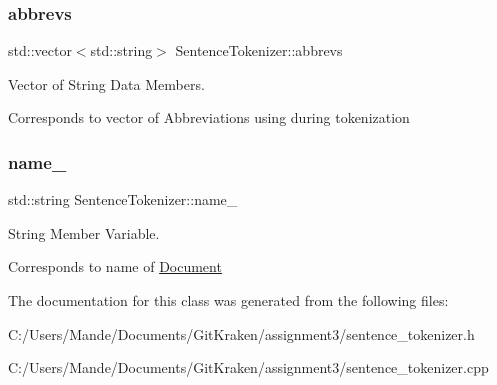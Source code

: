 \subsubsection{\texorpdfstring{abbrevs}{abbrevs}}
{\footnotesize\ttfamily std\+::vector$<$std\+::string$>$ Sentence\+Tokenizer\+::abbrevs\hspace{0.3cm}{\ttfamily [private]}}



Vector of String Data Members. 

Corresponds to vector of Abbreviations using during tokenization \mbox{\label{class_sentence_tokenizer_a7c3ce1b9636d33b34aedc21c1b9f552b}} 
\subsubsection{\texorpdfstring{name\+\_\+}{name\_}}
{\footnotesize\ttfamily std\+::string Sentence\+Tokenizer\+::name\+\_\+\hspace{0.3cm}{\ttfamily [private]}}



String Member Variable. 

Corresponds to name of \hyperlink{class_document}{Document} 

The documentation for this class was generated from the following files\+:\begin{DoxyCompactItemize}
\item 
C\+:/\+Users/\+Mande/\+Documents/\+Git\+Kraken/assignment3/sentence\+\_\+tokenizer.\+h\item 
C\+:/\+Users/\+Mande/\+Documents/\+Git\+Kraken/assignment3/sentence\+\_\+tokenizer.\+cpp\end{DoxyCompactItemize}
